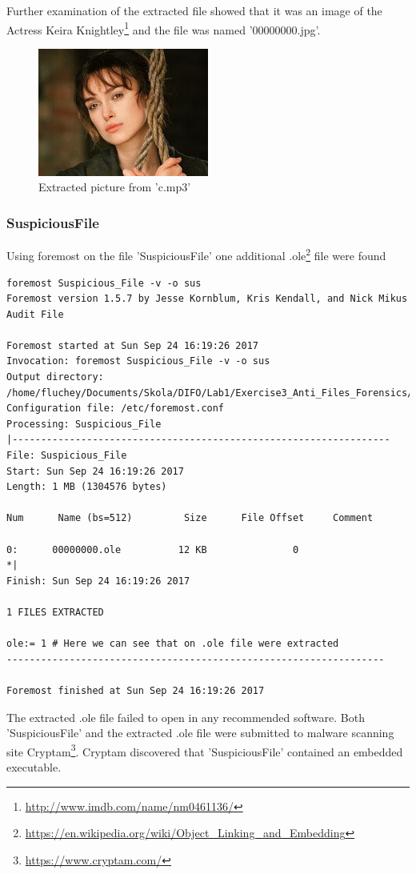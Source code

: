 \documentclass[a4paper,10pt,oneside]{article}
\begin{document}
Further examination of the extracted file showed that it was an image of the Actress Keira Knightley\footnote{\url{http://www.imdb.com/name/nm0461136/}} and the file was named '00000000.jpg'.
\begin{figure}[ht]
        \centering
        \includegraphics[width=0.5\textwidth]{00000000.jpg}
        \caption{Extracted picture from 'c.mp3'}
\end{figure}





\subsubsection{Suspicious\textunderscore File}



Using foremost on the file 'Suspicious\textunderscore File' one additional .ole\footnote{\url{https://en.wikipedia.org/wiki/Object_Linking_and_Embedding}} file were found

\begin{lstlisting}[caption= foremost file 'Suspicious\textunderscore File']
foremost Suspicious_File -v -o sus
Foremost version 1.5.7 by Jesse Kornblum, Kris Kendall, and Nick Mikus
Audit File

Foremost started at Sun Sep 24 16:19:26 2017
Invocation: foremost Suspicious_File -v -o sus
Output directory: /home/fluchey/Documents/Skola/DIFO/Lab1/Exercise3_Anti_Files_Forensics/sus
Configuration file: /etc/foremost.conf
Processing: Suspicious_File
|------------------------------------------------------------------
File: Suspicious_File
Start: Sun Sep 24 16:19:26 2017
Length: 1 MB (1304576 bytes)

Num      Name (bs=512)         Size      File Offset     Comment

0:      00000000.ole          12 KB               0
*|
Finish: Sun Sep 24 16:19:26 2017

1 FILES EXTRACTED

ole:= 1 # Here we can see that on .ole file were extracted
------------------------------------------------------------------

Foremost finished at Sun Sep 24 16:19:26 2017
\end{lstlisting}
The extracted .ole file failed to open in any recommended software. Both 'Suspicious\textunderscore File' and the extracted .ole file were submitted to malware scanning site Cryptam\footnote{\url{https://www.cryptam.com/}}.
Cryptam discovered that 'Suspicious\textunderscore File' contained an embedded executable.
\end{document}
